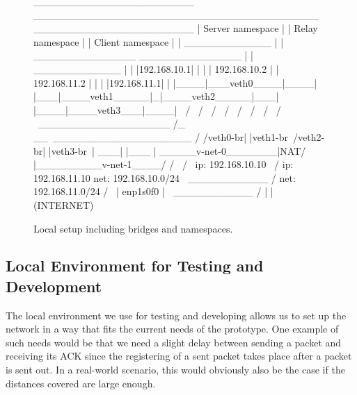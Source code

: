\vspace{0.5cm}
\begin{figure}[H]
\centering
\begin{myverbatim}
 ______________________         _______________________________________        ______________________
|   Server namespace   |       |            Relay namespace            |      |   Client namespace   |
|     ____________     |       |    ______________   ______________    |      |     ____________     |
|    |192.168.10.1|    |       |   | 192.168.10.2 | | 192.168.11.2 |   |      |    |192.168.11.1|    |
|____|___veth0____|____|       |___|____veth1_____|_|____veth2_____|___|      |____|____veth3___|____|
            \                            /                 \                             /
             \                          /                   \                           /
              \                        /                     \                         /
               \                      /                       \                       /
                \ __________________ /_                      __\ ___________________ /
                /veth0-br|     |veth1-br\                   /veth2-br|      |veth3-br\
                |                    ___|                   |___                     |
                \_____v-net-0_______|NAT/                   \NAT|_________v-net-1____/
                        /              \                     /                \
               ip: 192.168.10.10        \                   /         ip: 192.168.11.10
               net: 192.168.10.0/24      \   ___________   /          net: 192.168.11.0/24
                                           /             \
                                          |   enp1s0f0    |
                                           \ ___________ /
                                                  |
                                                  |
                                              (INTERNET)

\end{myverbatim}
\caption{Local setup including bridges and namespaces.}\label{fig:namespace-setup}
\end{figure}
\vspace{0.5cm}

\subsection{Local Environment for Testing and Development}\label{subsec:namespace_environment}
The local environment we use for testing and developing allows us to set up the network in a way 
that fits the current needs of the prototype.
One example of such needs would be that we need a slight delay between sending a packet and 
receiving its ACK since the registering of a sent packet takes place after a packet 
is sent out. 
In a real-world scenario, this would obviously also be the case if the distances covered 
are large enough.

